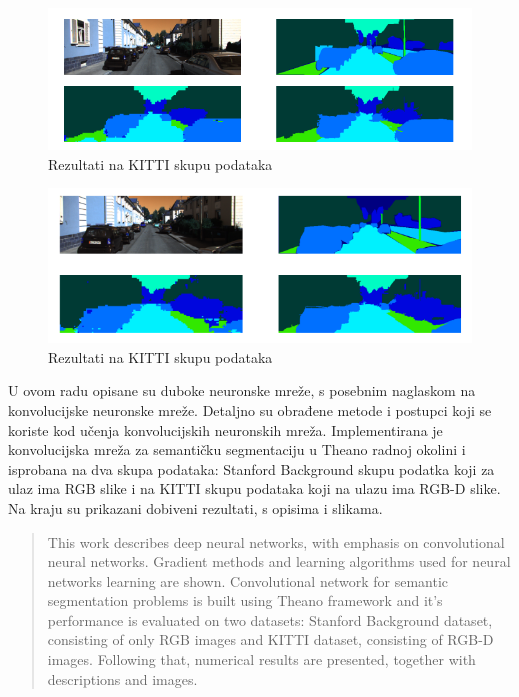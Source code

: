 \documentclass[times, utf8, diplomski, numeric]{fer}
\begin{document}
\begin{figure}[H]
  \centering
  \includegraphics[width=\textwidth]{imgs/kitti3.png}
  \caption{Rezultati na KITTI skupu podataka}
\end{figure}

\begin{figure}[H]
  \centering
  \includegraphics[width=\textwidth]{imgs/kitti4.png}
  \caption{Rezultati na KITTI skupu podataka}
\end{figure}

\newpage

\begin{sazetak}
U ovom radu opisane su duboke neuronske mreže, s posebnim naglaskom na konvolucijske neuronske mreže. Detaljno su obrađene metode i postupci koji se koriste kod učenja konvolucijskih neuronskih mreža. Implementirana je konvolucijska mreža za semantičku segmentaciju u Theano radnoj okolini i isprobana na dva skupa podataka: Stanford Background skupu podatka koji za ulaz ima RGB slike i na KITTI skupu podataka koji na ulazu ima RGB-D slike. Na kraju su prikazani dobiveni rezultati, s opisima i slikama.

\end{sazetak}

\begin{abstract}
This work describes deep neural networks, with emphasis on convolutional neural networks. Gradient methods and learning algorithms used for neural networks learning are shown. Convolutional network for semantic segmentation problems is built using Theano framework and it's performance is evaluated on two datasets: Stanford Background dataset, consisting of only RGB images and KITTI dataset, consisting of RGB-D images. Following that, numerical results are presented, together with descriptions and images.

\end{abstract}
\end{document}
